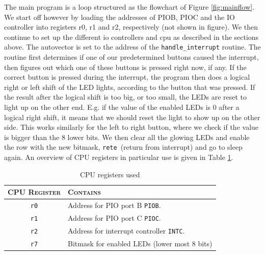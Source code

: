 The main program is a loop structured as the flowchart of Figure \ref{fig:mainflow}. We start off however by loading the addresses of PIOB, PIOC and the IO controller into registers r0, r1 and r2, respectively (not shown in figure). We then continue to set up the different io controllers and cpu as described in the sections above. The autovector is set to the address of the \texttt{handle\_interrupt} routine. The routine first determines if one of our predetermined buttons caused the interrupt, then figures out which one of these buttons is pressed right now, if any. If the correct button is pressed during the interrupt, the program then does a logical right or left shift of the LED lights, according to the button that was pressed. If the result after the logical shift is too big, or too small, the LEDs are reset to light up on the other end. E.g. if the value of the enabled LEDs is 0 after a logical right shift, it means that we should reset the light to show up on the other side. This works similarly for the left to right button, where we check if the value is bigger than the 8 lower bits. We then clear all the glowing LEDs and enable the row with the new bitmask, \texttt{rete} (return from interrupt) and go to sleep again. An overview of CPU registers in particular use is given in Table \ref{table:cpuregs}.

\begin{table}
 \centering
 \begin{tabular}{| c | l |}
    \hline
    \textsc{CPU Register} & \textsc{Contains} \\ \hline
    \texttt{r0} &       Address for PIO port B \texttt{PIOB}. \\
    \texttt{r1} &       Address for PIO port C \texttt{PIOC}. \\
    \texttt{r2} &       Address for interrupt controller \texttt{INTC}. \\
    \texttt{r7} &	Bitmask for enabled LEDs (lower most 8 bits) \\
    \hline
 \end{tabular}
 \caption{CPU registers used}
 \label{table:cpuregs}
\end{table}

